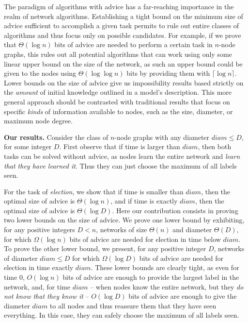 \documentclass[11pt]{article}
\begin{document}
The paradigm of algorithms with advice has a far-reaching importance in the realm of network algorithms. Establishing a tight bound on the minimum size of advice sufficient to accomplish a given task permits to rule out
entire classes of algorithms and thus focus only on possible candidates. For example, if we prove that $\Theta(\log n)$ bits of advice are needed to perform a certain task in $n$-node graphs, this rules out all 
potential algorithms that can work using only some linear upper bound on the size of the network, as such an upper bound could be given
to the nodes using $\Theta(\log \log n)$ bits by providing them with
$\lceil \log n \rceil$. Lower bounds on the size of advice
give us impossibility results based strictly on the \emph{amount} of initial knowledge outlined in a model's description.
This more general approach should be contrasted with
traditional results that focus on specific \emph{kinds} of information available to nodes, such as the size, diameter, or maximum node degree. 






\noindent
{\bf Our results.} Consider the class of $n$-node graphs with any diameter $diam \leq D$, for some integer $D$.
First observe that if time is larger than $diam$, then both tasks can be solved without advice,
as nodes learn the entire network and {\em learn that they have learned it}. Thus they can just choose the maximum of all labels seen.



For the task of {\em election}, we show that if time is smaller than $diam$, then the optimal size of advice is $\Theta(\log n)$,
and if time is exactly $diam$, then the optimal size of advice is $\Theta(\log D)$. 
Here our contribution consists in proving two lower bounds on the size of advice. We prove one lower bound by exhibiting, for any positive integers $D<n$, networks of size $\Theta(n)$ and diameter $\Theta(D)$, for which
$\Omega(\log n)$ bits of advice are needed for election in time below $diam$. To prove the other lower bound, we present, for any positive integer $D$, networks of diameter 
$diam \leq D$ for which $\Omega(\log D)$ bits of advice are needed for election in time exactly $diam$. 
These lower bounds are clearly tight, as even for time 0, $O(\log n)$ bits of advice are enough to provide the largest label in the network, and, for time $diam$ --
when nodes know the entire network, but they {\em do not know that they know it} -- $O(\log D)$ bits of advice are enough to give the diameter $diam$ to all nodes and thus reassure them that they have seen everything. In this case,  they can safely choose the maximum of all labels seen.
\end{document}
